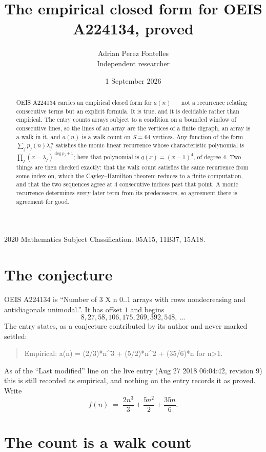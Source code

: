 \documentclass[11pt,a4paper]{article}
\title{The empirical closed form for OEIS A224134, proved}
\author{Adrian Perez Fontelles\\ \small Independent researcher}
\date{1 September 2026}
\theoremstyle{plain}
\theoremstyle{definition}
\begin{document}
\maketitle

\begin{abstract}
OEIS A224134 carries an empirical closed form for $a(n)$ --- not a recurrence relating
consecutive terms but an explicit formula. It is true, and it is decidable rather than
empirical. The entry counts arrays subject to a condition on a bounded window of consecutive lines, so the lines of an array are the
vertices of a finite digraph, an array is a walk in it, and $a(n)$ is a walk count on
$S=64$ vertices. Any function of the form $\sum_j p_j(n)\lambda_j^{\,n}$ satisfies the
monic linear recurrence whose characteristic polynomial is
$\prod_j(x-\lambda_j)^{\deg p_j+1}$; here that polynomial is $q(x)=(x-1)^{4}$, of degree
$4$. Two things are then checked exactly: that the walk count satisfies the same
recurrence from some index on, which the Cayley--Hamilton theorem reduces to a finite
computation, and that the two sequences agree at $4$ consecutive indices past that
point. A monic recurrence determines every later term from its predecessors, so agreement
there is agreement for good.
\end{abstract}

\noindent\small 2020 Mathematics Subject Classification. 05A15, 11B37, 15A18.\normalsize

\section{The conjecture}

OEIS A224134 is ``Number of 3 X n 0..1 arrays with rows nondecreasing and antidiagonals unimodal.''. It has offset $1$ and begins
\[
8, 27, 58, 106, 175, 269, 392, 548,\ \dots
\]
The entry states, as a conjecture contributed by its author and never marked settled:
\begin{quote}
Empirical: a(n) = (2/3)*n\^{}3 + (5/2)*n\^{}2 + (35/6)*n for n>1.
\end{quote}
As of the ``Last modified'' line on the live entry (Aug 27 2018 06:04:42, revision 9) this is still
recorded as empirical, and nothing on the entry records it as proved. Write
\[
f(n)\;=\;\frac{2 n^{3}}{3} + \frac{5 n^{2}}{2} + \frac{35 n}{6}.
\]

\section{The count is a walk count}
\end{document}

